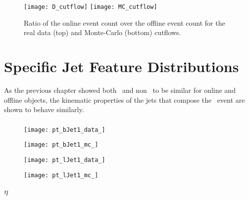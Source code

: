 	\begin{figure}[h]
		\centering
		\texttt{[image: D\_cutflow]}
		\texttt{[image: MC\_cutflow]}
		\caption{Ratio of the online event count over the offline event count for the real data (top) and Monte-Carlo (bottom) cutflows.}
		\label{f:cutflow}
	\end{figure}




\section{Specific Jet Feature Distributions}

	As the previous chapter showed both \bjets\, and non \bjets\, to be similar for online and offline objects, the kinematic properties of the jets that compose the \VBFHBB\, event are shown to behave similarly.

		\subsubsection{\pt}

			\begin{figure}[h]
				\centering

				\begin{minipage}[h]{0.33\linewidth}
					\texttt{[image: pt\_bJet1\_data\_]}
				\end{minipage}
				\quad
				\begin{minipage}[h]{0.33\linewidth}
					\texttt{[image: pt\_bJet1\_mc\_]}
				\end{minipage}

				\begin{minipage}[h]{0.33\linewidth}
					\texttt{[image: pt\_lJet1\_data\_]}
				\end{minipage}
				\quad
				\begin{minipage}[h]{0.33\linewidth}
					\texttt{[image: pt\_lJet1\_mc\_]}
				\end{minipage}

			\end{figure}



			\subsubsection{$\eta$}

